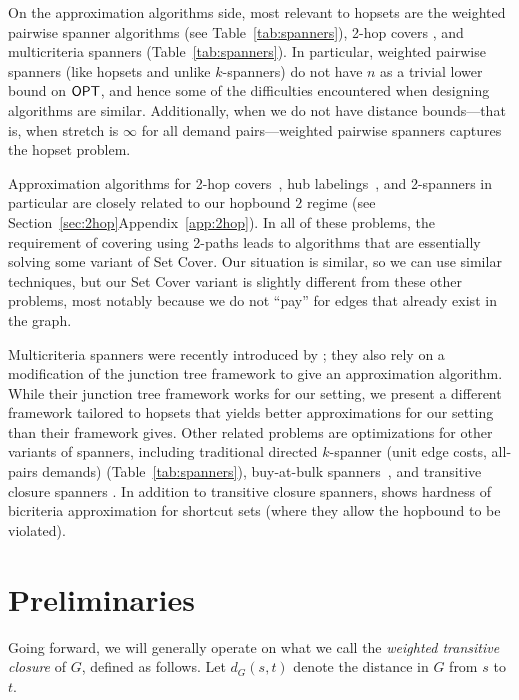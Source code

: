 \documentclass{article}
\theoremstyle{definition}
\theoremstyle{remark}
\def\opt {{\sf OPT}}
\begin{document}
On the approximation algorithms side, most relevant to hopsets are the weighted pairwise spanner algorithms \cite{GKL23} (see Table~\ref{tab:spanners}), 2-hop covers \cite{CHHZ2003}, and multicriteria spanners \cite{GKL24} (Table~\ref{tab:spanners}). In particular, weighted pairwise spanners (like hopsets and unlike $k$-spanners) do not have $n$ as a trivial lower bound on $\opt$, and hence some of the difficulties encountered when designing algorithms are similar. Additionally, when we do not have distance bounds---that is, when stretch is $\infty$ for all demand pairs---weighted pairwise spanners captures the hopset problem.

Approximation algorithms for 2-hop covers~\cite{CHHZ2003}, hub labelings~\cite{CHHZ2003,BGGN17}, and 2-spanners \cite{KP94,DK11} in particular are closely related to our hopbound $2$ regime (see \iflong Section~\ref{sec:2hop}\else Appendix~\ref{app:2hop}\fi).  In all of these problems, the requirement of covering using 2-paths leads to algorithms that are essentially solving some variant of Set Cover.  Our situation is similar, so we can use similar techniques, but our Set Cover variant is slightly different from these other problems, most notably because we do not ``pay'' for edges that already exist in the graph. 

Multicriteria spanners were recently introduced by \cite{GKL24}; they also rely on a modification of the junction tree framework to give an approximation algorithm. While their junction tree framework works for our setting, we present a different framework tailored to hopsets that yields better approximations for our setting than their framework gives.
Other related problems are optimizations for other variants of spanners, including traditional directed $k$-spanner (unit edge costs, all-pairs demands) \cite{DK11, BBMRY11} (Table~\ref{tab:spanners}), buy-at-bulk spanners~\cite{bulkGKL24}, and transitive closure spanners \cite{BGJRW08, CJMN25}. In addition to transitive closure spanners, \cite{CJMN25} shows hardness of bicriteria approximation for shortcut sets (where they allow the hopbound to be violated).


\section{Preliminaries}
Going forward, we will generally operate on what we call the \textit{weighted transitive closure} of $G$, defined as follows. Let $d_G(s,t)$ denote the distance in $G$ from $s$ to $t$.
\end{document}
